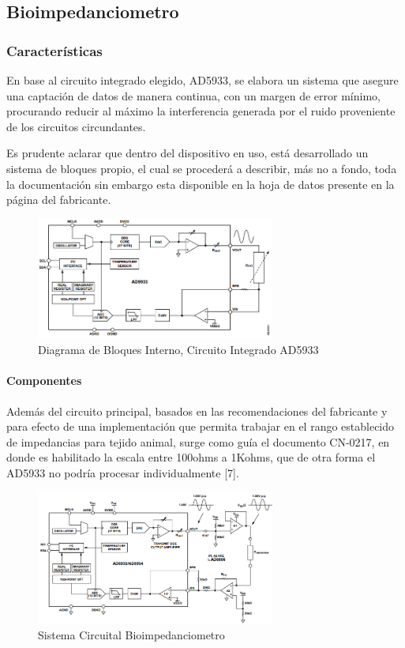 \documentclass[12pt,letterpaper,spanish]{article}
\begin{document}
		\subsection{Bioimpedanciometro}	
			\subsubsection{Características}
			En base al circuito integrado elegido, AD5933, se elabora un sistema que asegure una captación de datos de manera continua, con un margen de error mínimo, procurando reducir al máximo la interferencia generada por el ruido proveniente de los circuitos circundantes.
			
Es prudente aclarar que dentro del dispositivo en uso, está desarrollado un sistema de bloques propio, el cual se procederá a describir, más no a fondo, toda la documentación sin embargo esta disponible en la hoja de datos  presente en la página del fabricante.

			\begin{figure}[H]
				\centering
				\includegraphics[width=0.7\textwidth]{./Imagenes/D_Bloques_AD5933.png}
				\caption{Diagrama de Bloques Interno, Circuito Integrado AD5933}
			\end{figure}
			
				\paragraph{Componentes}
				\hfill\break
				Además del circuito principal, basados en las recomendaciones del fabricante y para efecto de una implementación que permita trabajar en el rango establecido de impedancias para tejido animal, surge como guía el documento CN-0217, en donde es habilitado la escala entre 100ohms a 1Kohms, que de otra forma el AD5933 no podría procesar individualmente [7]. 
				
			\begin{figure}[H]
				\centering
				\includegraphics[width=0.7\textwidth]{./Imagenes/Bio_Circuito.png}
				\caption{Sistema Circuital Bioimpedanciometro}
			\end{figure}				
				
\end{document}
